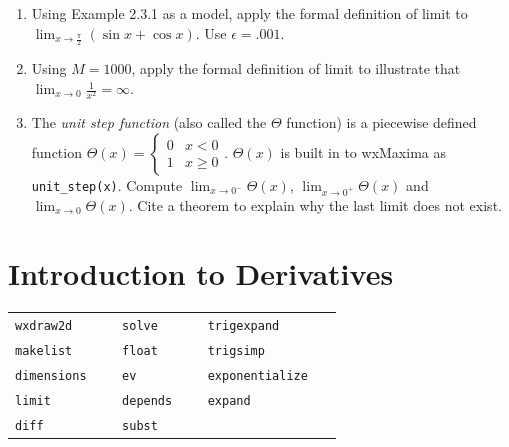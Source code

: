 \documentclass[10.5pt,twoside]{report}
\theoremstyle{definition}
\begin{document}
\begin{enumerate}
\item Using Example 2.3.1 as a model, apply the formal definition of limit to $\lim_{x \to \frac{\pi}{2}}(\sin{x}+\cos{x})$.  Use $\epsilon = .001$.

\item Using $M=1000$, apply the formal definition of limit to illustrate that $\lim_{x \to 0}\frac{1}{x^2}=\infty$. 

\item  The \textit{unit step function} (also called the $\Theta$ function) is a piecewise defined function $\Theta(x)=\begin{cases} 0 & x<0 \\ 1 & x \geq 0 \end{cases}$.  $\Theta(x)$ is built in to wxMaxima as \verb|unit_step(x)|.  Compute $\lim_{x \to 0^-}\Theta(x)$, $\lim_{x \to 0^+}\Theta(x)$ and $\lim_{x \to 0}\Theta(x)$.  Cite a theorem to explain why the last limit does not exist.





\end{enumerate}


\pagebreak

\chapter{Introduction to Derivatives}

\vspace*{\fill}

\minitoc

\vspace*{\fill}



\newline
\newline

\begin{tabular}{l l l}
 \verb|wxdraw2d   |   &\verb|solve   |   &\verb|trigexpand   |   \\
 \verb|makelist   |   &\verb|float   |   &\verb|trigsimp   |   \\
 \verb|dimensions   |   &\verb|ev   |   &\verb|exponentialize   |   \\
 \verb|limit   |   &\verb|depends   |   &\verb|expand   |   \\
 \verb|diff   |   &\verb|subst   |   &\verb|   |   \\
\end{tabular}
\end{document}
